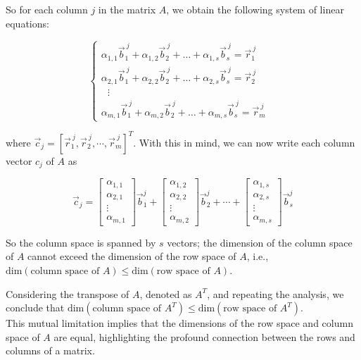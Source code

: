 So for each column $j$ in the matrix $A$, we obtain the following system of linear equations:

\[
\begin{cases}
\alpha_{1,1}\vec b_{1}^{\ j} + \alpha_{1,2}\vec b_{2}^{\ j} + \dots + \alpha_{1,s}\vec b_{s}^{\ j} = \vec r_{1}^{\ j}\\
\alpha_{2,1}\vec b_{1}^{\ j} + \alpha_{2,2}\vec b_{2}^{\ j} + \dots + \alpha_{2,s}\vec b_{s}^{\ j} = \vec r_{2}^{\ j}\\
\ \ \ \vdots & \\
\alpha_{m,1}\vec b_{1}^{\ j} + \alpha_{m,2}\vec b_{2}^{\ j} + \dots + \alpha_{m,s}\vec b_{s}^{\ j} = \vec r_{m}^{\ j}
\end{cases}
\]

where $\vec c_j = [\vec r_1^{\ j}, \vec r_2^{\ j}, \cdots, \vec r_m^{\ j}]^T$. With this in mind, we can now write each column vector $c_j$ of $A$ as

$$
\vec c_j = \begin{bmatrix}
    \alpha_{1,1}\\
    \alpha_{2,1}\\
    \vdots\\
    \alpha_{m,1}
\end{bmatrix} \vec b_{1}^j + \begin{bmatrix}
    \alpha_{1,2}\\
    \alpha_{2,2}\\
    \vdots\\
    \alpha_{m,2}
\end{bmatrix} \vec b_{2}^j + \cdots + \begin{bmatrix}
    \alpha_{1,s}\\
    \alpha_{2,s}\\
    \vdots\\
    \alpha_{m,s}
\end{bmatrix} \vec b_{s}^j
$$

So the column space is spanned by $s$ vectors; the dimension of the column space of \( A \) cannot exceed the dimension of the row space of \( A \), i.e., \( \text{dim}(\text{column space of } A) \leq \text{dim}(\text{row space of } A) \).

Considering the transpose of \( A \), denoted as \( A^T \), and repeating the analysis, we conclude that \( \text{dim}(\text{column space of } A^T) \leq \text{dim}(\text{row space of } A^T) \).
\\

This mutual limitation implies that the dimensions of the row space and column space of \( A \) are equal, highlighting the profound connection between the rows and columns of a matrix.

